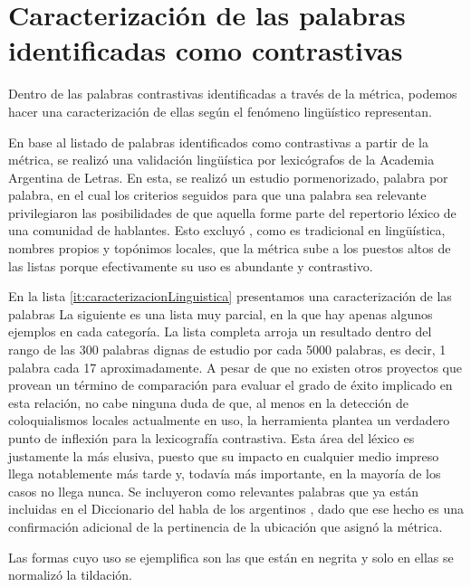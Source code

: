 
\section{Caracterización de las palabras identificadas como contrastivas}
\label{caracterizacion_resultados}

Dentro de las palabras contrastivas identificadas a través de la métrica, podemos hacer una caracterización de ellas según el fenómeno lingüístico representan.


En base al listado de palabras identificados como contrastivas a partir de la métrica, se realizó una validación lingüística por lexicógrafos de la Academia Argentina de Letras. En esta, se realizó un estudio pormenorizado, palabra por palabra, en el cual los criterios seguidos para que una palabra sea relevante privilegiaron las posibilidades de que aquella forme parte del repertorio léxico de una comunidad de hablantes. Esto excluyó , como es tradicional en lingüística, nombres propios y topónimos locales, que la métrica sube a los puestos altos de las listas porque efectivamente su uso es abundante y contrastivo. 

En la lista \ref{it:caracterizacionLinguistica} presentamos una caracterización de las palabras La siguiente es una lista muy parcial, en la que hay apenas algunos ejemplos en cada categoría. La lista completa arroja un resultado dentro del rango de las 300 palabras dignas de estudio por cada 5000 palabras, es decir, 1 palabra cada 17 aproximadamente. A pesar de que no existen otros proyectos que provean un término de comparación para evaluar el grado de éxito implicado en esta relación, no cabe ninguna duda de que, al menos en la detección de coloquialismos locales actualmente en uso, la herramienta plantea un verdadero punto de inflexión para la lexicografía contrastiva. Esta área del léxico es justamente la más elusiva, puesto que su impacto en cualquier medio impreso llega notablemente más tarde y, todavía más importante, en la mayoría de los casos no llega nunca. Se incluyeron como relevantes palabras que ya están incluidas en el Diccionario del habla de los argentinos \cite{academia2008diccionario}, dado que ese hecho es una confirmación adicional de la pertinencia de la ubicación que asignó la métrica.

Las formas cuyo uso se ejemplifica son las que están en negrita y solo en ellas se normalizó la tildación.




